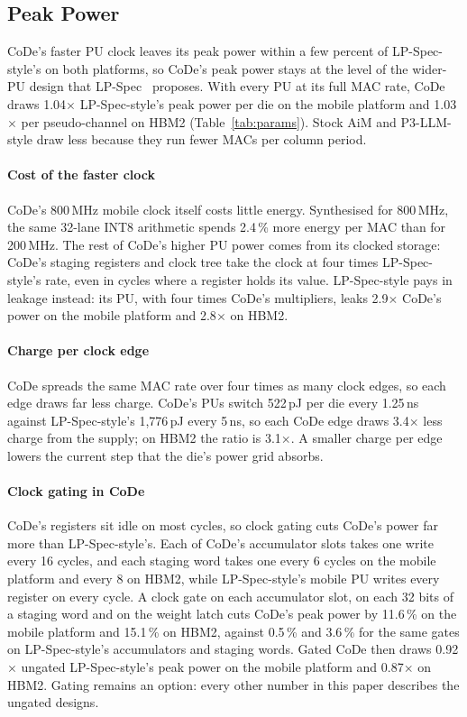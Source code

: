 \subsection{Peak Power}
\label{sec:eval:power}

CoDe's faster PU clock leaves its peak power within a few percent of LP-Spec-style's on both platforms, so CoDe's peak
power stays at the level of the wider-PU design that LP-Spec~\cite{lpspec} proposes. With every PU at its full MAC
rate, CoDe draws 1.04$\times$ LP-Spec-style's peak power per die on the mobile platform and 1.03$\times$ per
pseudo-channel on HBM2 (Table~\ref{tab:params}). Stock AiM and P3-LLM-style draw less because they run fewer MACs per
column period.

\paragraph{Cost of the faster clock}
CoDe's 800\,MHz mobile clock itself costs little energy. Synthesised for 800\,MHz, the same 32-lane INT8 arithmetic
spends 2.4\,\% more energy per MAC than for 200\,MHz. The rest of CoDe's higher PU power comes from its clocked
storage: CoDe's staging registers and clock tree take the clock at four times LP-Spec-style's rate, even in cycles
where a register holds its value. LP-Spec-style pays in leakage instead: its PU, with four times CoDe's multipliers,
leaks 2.9$\times$ CoDe's power on the mobile platform and 2.8$\times$ on HBM2.

\paragraph{Charge per clock edge}
CoDe spreads the same MAC rate over four times as many clock edges, so each edge draws far less charge. CoDe's PUs
switch 522\,pJ per die every 1.25\,ns against LP-Spec-style's 1,776\,pJ every 5\,ns, so each CoDe edge draws
3.4$\times$ less charge from the supply; on HBM2 the ratio is 3.1$\times$. A smaller charge per edge lowers the
current step that the die's power grid absorbs.

\paragraph{Clock gating in CoDe}
CoDe's registers sit idle on most cycles, so clock gating cuts CoDe's power far more than LP-Spec-style's. Each of
CoDe's accumulator slots takes one write every 16 cycles, and each staging word takes one every 6 cycles on the mobile
platform and every 8 on HBM2, while LP-Spec-style's mobile PU writes every register on every cycle. A clock gate on
each accumulator slot, on each 32 bits of a staging word and on the weight latch cuts CoDe's peak power by 11.6\,\% on
the mobile platform and 15.1\,\% on HBM2, against 0.5\,\% and 3.6\,\% for the same gates on LP-Spec-style's
accumulators and staging words. Gated CoDe then draws 0.92$\times$ ungated LP-Spec-style's peak power on the mobile
platform and 0.87$\times$ on HBM2. Gating remains an option: every other number in this paper describes the ungated
designs.
